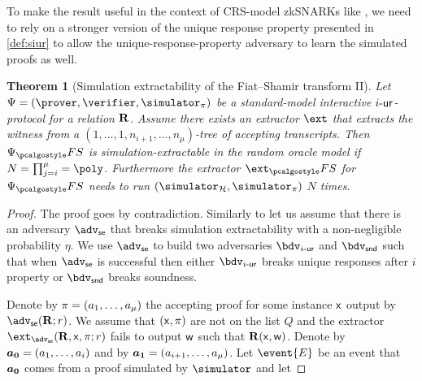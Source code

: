 \documentclass[runningheads,11pt]{llncs}
\let\spvec\vec
\let\vec\accentvec
\let\vec\spvec
\def\vec#1{\mathchoice{\mbox{\boldmath$\displaystyle#1$}}
	{\mbox{\boldmath$\textstyle#1$}}
	{\mbox{\boldmath$\scriptstyle#1$}}
	{\mbox{\boldmath$\scriptscriptstyle#1$}}}
\newtheorem{theorem}{Theorem}%
\theoremstyle{definition}
\begin{document}
To make the result useful in the context of CRS-model zkSNARKs like \plonk, we need to rely on a stronger version of the unique response property presented in \cref{def:siur} to allow the unique-response-property adversary to learn the simulated proofs as well.

\begin{theorem}[Simulation extractability of the Fiat--Shamir transform II]
	\label{thm:wit_ext_em_FS}
	Let $\proofsystem = (\prover, \verifier, \simulator_\zkproof)$ be a standard-model interactive ${i\text{-}\mathsf{ur}}$-protocol for a relation $\mathbf{R}$.
	Assume there exists an extractor $\ext$ that extracts the witness from a $(1, \ldots, 1, n_{i + 1}, \ldots, n_\mu)$-tree of accepting transcripts.
	Then $\proofsystem_\fs$ is simulation-extractable in the random oracle model if $N =\prod_{j = i}^\mu = \poly$.
	Furthermore the extractor $\ext_\fs$ for $\proofsystem_\fs$ needs to run $(\simulator_\ro, \simulator_\zkproof)$ $N$ times.
\end{theorem}
\begin{proof}
	The proof goes by contradiction. Similarly to \cite{INDOCRYPT:FKMV12}
	let us assume that there is an adversary $\adv_{\se}$ that breaks simulation extractability with a non-negligible probability $\eta$. We use $\adv_\se$ to build two adversaries $\bdv_\ur{i}$ and $\bdv_\snd$ such that when $\adv_\se$ is successful then either $\bdv_\ur{i}$ breaks unique responses after $i$ property or $\bdv_\snd$ breaks soundness.

	Denote by $\pi = (a_1, \ldots, a_\mu)$ the accepting proof for some instance $\mathsf{x}$ output by $\adv_\se(\REL; r)$. We assume that $(\mathsf{x}, \pi)$ are not on the list $Q$ and the extractor $\ext_{\adv_\se}(\REL, \inp, \zkproof; r)$ fails to output $\mathsf{w}$ such that $\mathbf{R}(\mathsf{x}, \mathsf{w})$.
	Denote by $\vec{a_0} = (a_1, \ldots, a_i)$ and by $\vec{a_1} = (a_{i + 1}, \ldots, a_\mu)$.
	Let $\event{E}$ be an event that $\vec{a_0}$ comes from a proof simulated by $\simulator$ and let
\end{proof}
%
\end{document}

